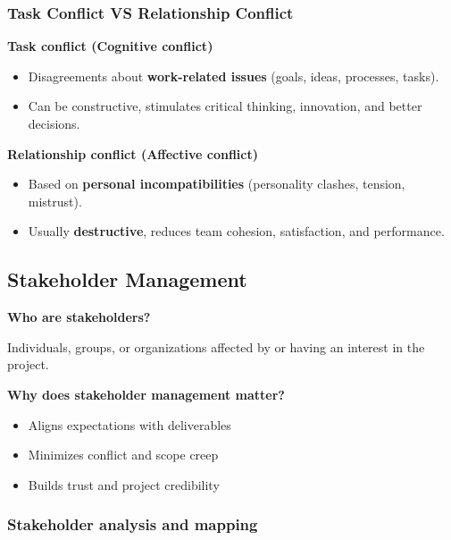 \subsubsection{Task Conflict VS Relationship Conflict}

\indent 

\noindent\textbf{Task conflict (Cognitive conflict)}

\begin{itemize}
    \item Disagreements about \textbf{work-related issues} (goals, ideas, processes, tasks).
    \item Can be constructive, stimulates critical thinking, innovation, and better decisions.
\end{itemize}

\bigskip

\noindent\textbf{Relationship conflict (Affective conflict)}

\begin{itemize}
    \item Based on \textbf{personal incompatibilities} (personality clashes, tension, mistrust).
    \item Usually \textbf{destructive}, reduces team cohesion, satisfaction, and performance.
\end{itemize}

\subsection{Stakeholder Management}

\indent

\noindent\textbf{Who are stakeholders?}

Individuals, groups, or organizations affected by or having an interest in the project.

\bigskip

\noindent\textbf{Why does stakeholder management matter?}

\begin{itemize}
    \item Aligns expectations with deliverables
    \item Minimizes conflict and scope creep
    \item Builds trust and project credibility
\end{itemize}

\subsubsection{Stakeholder analysis and mapping}


